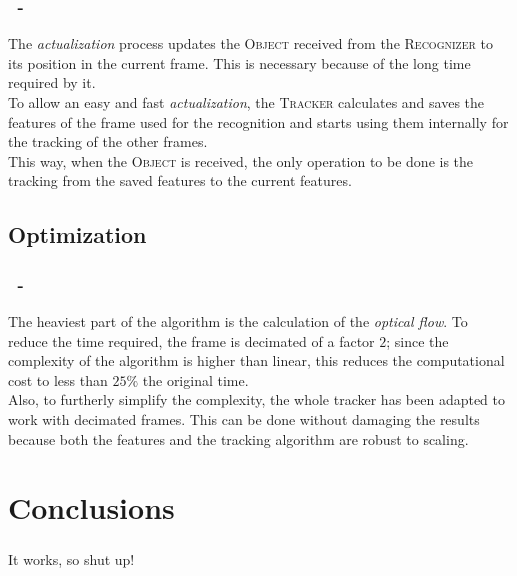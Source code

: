 \documentclass{beamer}
\begin{document}
	\begin{frame}
		\frametitle{\insertsection\ - \insertsubsection}
		The \emph{actualization} process updates the \textsc{Object} received from
		the \textsc{Recognizer} to its position in the current frame. This is
		necessary because of the long time required by it.\\
		To allow an easy and fast \emph{actualization}, the \textsc{Tracker}
		calculates and saves the features of the frame used for the recognition
		and starts using them internally for the tracking of the other frames.\\
		This way, when the \textsc{Object} is received, the only operation to be
		done is the tracking from the saved features to the current features.\\
	\end{frame}
	
	\subsection{Optimization}

	\begin{frame}
		\frametitle{\insertsection\ - \insertsubsection}
		The heaviest part of the algorithm is the calculation of the \emph{optical
		flow}. To reduce the time required, the frame is decimated of a factor
		$2$; since the complexity of the algorithm is higher than linear, this
		reduces the computational cost to less than $25\%$ the original time.\\
		Also, to furtherly simplify the complexity, the whole tracker has been
		adapted to work with decimated frames. This can be done without damaging
		the results because both the features and the tracking algorithm are robust
		to scaling.\\
	\end{frame}

	\section{Conclusions}

	\begin{frame}
		\frametitle{\insertsection}
		It works, so shut up!
	\end{frame}
\end{document}
